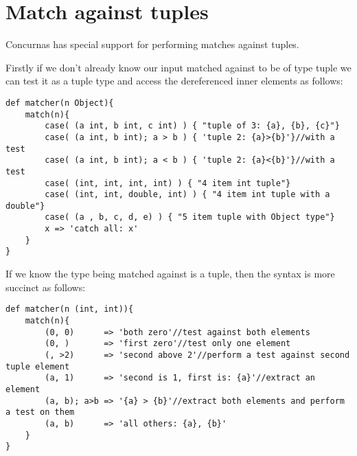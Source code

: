 \documentclass[conc-doc]{subfiles}
\begin{document}
\section{Match against tuples}
Concurnas has special support for performing matches against tuples.

Firstly if we don't already know our input matched against to be of type tuple we can test it as a tuple type and access the dereferenced inner elements as follows:
\begin{lstlisting}
def matcher(n Object){
	match(n){
		case( (a int, b int, c int) ) { "tuple of 3: {a}, {b}, {c}"}
		case( (a int, b int); a > b ) { 'tuple 2: {a}>{b}'}//with a test
		case( (a int, b int); a < b ) { 'tuple 2: {a}<{b}'}//with a test
		case( (int, int, int, int) ) { "4 item int tuple"}
		case( (int, int, double, int) ) { "4 item int tuple with a double"}
		case( (a , b, c, d, e) ) { "5 item tuple with Object type"}
		x => 'catch all: x'
	}
}
\end{lstlisting}

If we know the type being matched against is a tuple, then the syntax is more succinct as follows:
\begin{lstlisting}
def matcher(n (int, int)){
	match(n){
		(0, 0)      => 'both zero'//test against both elements
		(0, )       => 'first zero'//test only one element
		(, >2)      => 'second above 2'//perform a test against second tuple element
		(a, 1)      => 'second is 1, first is: {a}'//extract an element
		(a, b); a>b => '{a} > {b}'//extract both elements and perform a test on them
		(a, b)      => 'all others: {a}, {b}'
	}
}
\end{lstlisting}
\end{document}
